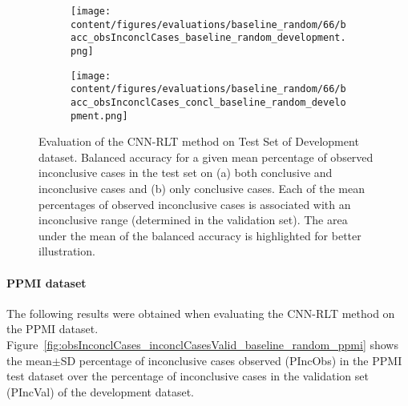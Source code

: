 \begin{figure}[ht]
  \begin{subfigure}{0.5\textwidth}
    \centering
    \texttt{[image: content/figures/evaluations/baseline\_random/66/bacc\_obsInconclCases\_baseline\_random\_development.png]}
    \subcaption{}
    \label{fig:bacc_obsInconclCases_baseline_random_development}
  \end{subfigure}
  \hfill
  \begin{subfigure}{0.5\textwidth}
    \centering
    \texttt{[image: content/figures/evaluations/baseline\_random/66/bacc\_obsInconclCases\_concl\_baseline\_random\_development.png]}
    \subcaption{}
    \label{fig:bacc_obsInconclCases_concl_baseline_random_development}
  \end{subfigure}

  \caption{Evaluation of the CNN-RLT method on Test Set of Development dataset.
  Balanced accuracy for a given mean percentage of observed inconclusive cases in the test set on 
  (a) both conclusive and inconclusive cases and (b) only conclusive cases. 
  Each of the mean percentages of observed inconclusive cases is associated with an inconclusive range (determined in the validation set). 
  The area under the mean of the balanced accuracy is highlighted for better illustration.}
  \label{fig:bacc_obsInconclCases_baseline_random_development_full}
\end{figure}





\paragraph{PPMI dataset}

The following results were obtained when evaluating the CNN-RLT method on the PPMI dataset.
Figure~\ref{fig:obsInconclCases_inconclCasesValid_baseline_random_ppmi} shows the
mean$\pm$SD percentage of inconclusive cases observed (PIncObs) in the PPMI test dataset 
over the percentage of inconclusive cases in the validation set (PIncVal) of the development dataset.

